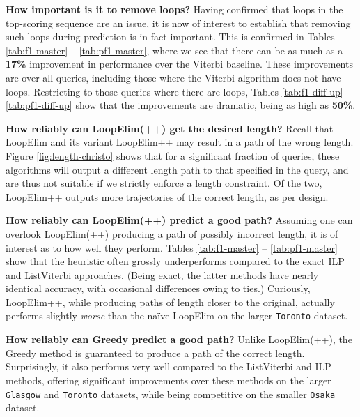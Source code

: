 \textbf{How important is it to remove loops?}
Having confirmed that loops in the top-scoring sequence are an issue,
it is now of interest to establish that removing such loops during prediction is in fact important.
This is confirmed in Tables \ref{tab:f1-master} -- \ref{tab:pf1-master},
where we see that there can be as much as a \textbf{17\%} improvement in performance over the {\sc Viterbi} baseline.
These improvements are over all queries, including those where the {\sc Viterbi} algorithm does not have loops.
Restricting to those queries where there are loops,
Tables \ref{tab:f1-diff-up} -- \ref{tab:pf1-diff-up}
show that the improvements are dramatic, being as high as \textbf{50\%}.

\textbf{How reliably can {\sc LoopElim(++)} get the desired length?}
Recall that
{\sc LoopElim} and its variant {\sc LoopElim++}
may result in a path of the wrong length.
Figure \ref{fig:length-christo} shows that for a significant fraction of queries,
these algorithms
will output a different length path to that specified in the query,
and are thus not suitable if we strictly enforce a length constraint.
Of the two, {\sc LoopElim++} outputs more trajectories of the correct length, as per design.

\textbf{How reliably can {\sc LoopElim(++)} predict a good path?}
Assuming one can overlook {\sc LoopElim(++)} producing a path of possibly incorrect length,
it is of interest as to how well
they perform.
Tables \ref{tab:f1-master} -- \ref{tab:pf1-master} show that the heuristic often
grossly underperforms compared to the exact {\sc ILP} and {\sc ListViterbi} approaches.
(Being exact, the latter methods have nearly identical accuracy, with occasional differences owing to ties.)
Curiously, {\sc LoopElim++}, while producing paths of length closer to the original, actually performs slightly \emph{worse} than the na\"{i}ve {\sc LoopElim} on the larger {\tt Toronto} dataset.


\textbf{How reliably can {\sc Greedy} predict a good path?}
Unlike {\sc LoopElim(++)}, the {\sc Greedy} method is guaranteed to produce a path of the correct length.
Surprisingly, it also performs very well compared to the {\sc ListViterbi} and {\sc ILP} methods, 
offering significant improvements over these methods on the larger {\tt Glasgow} and {\tt Toronto} datasets,
while being competitive on the smaller {\tt Osaka} dataset.


